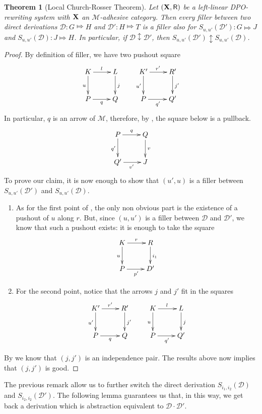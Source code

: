 \documentclass[a4paper]{article}
\def\R{\mathsf{R}}
\def\X{\textbf {\textup{X}}}
\renewcommand{\P}{\textbf {\textup{P}}}
\newcommand{\dder}[1]{\mathscr{#1}}
\newtheorem{theorem}{Theorem}[section]
\theoremstyle{definition}
\begin{document}
\begin{theorem}[Local Church-Rosser Theorem]\label{prop:fil}Let $(\X, \R)$ be a left-linear DPO-rewriting system with $\X$ an $\mathcal{M}$-adhesive category. Then every filler between two direct derivations $\dder{D}\colon G\Mapsto H$ and $\dder{D}'\colon H\Mapsto T$ is a filler also for $S_{u,u'}(\dder{D'})\colon G\Mapsto J$ and $S_{u,u'}(\dder{D})\colon J\Mapsto H$. In particular, if $\dder{D}\updownarrow \dder{D}'$, then $S_{u,u'}(\dder{D}')\updownarrow S_{u,u'}(\dder{D})$.
\end{theorem}
\begin{proof}By definition of filler, we have two pushout square
		\[\xymatrix{K \ar[r]^{l} \ar[d]_{u}& L \ar[d]^{j} & K' \ar[r]^{r'} \ar[d]_{u'} & R' \ar[d]^{j'}\\ P \ar[r]_q & Q & P \ar[r]_{q'} & Q'}\]
		In particular, $q$ is an arrow of $\mathcal{M}$, therefore, by , the square below is a pullback.
		\[\xymatrix{P \ar[r]^{q} \ar[d]_{q'}& Q\ar[d]^{v}\\ Q' \ar[r]_{v'} & J}\]
		To prove our claim, it is now enough to show that $(u',u)$ is a filler between $S_{u,u'}(\dder{D}')$ and $S_{u, u'}(\dder{D})$.
		\begin{enumerate}
			\item As for the first  point of , the only non obvious part is the existence of a pushout of $u$ along $r$. But, since $(u,u')$ is a filler between $\dder{D}$ and $\dder{D'}$, we know that such a pushout exists: it is enough to take the square
			\[\xymatrix{K \ar[r]^{r} \ar[d]_{u}& R \ar[d]^{i_1} \\P \ar[r]_{p'}& D'}\]
			\item For the second point, notice that the arrows $j$ and $j'$ fit in the squares
	\[\xymatrix{K' \ar[r]^{r'} \ar[d]_{u'}& R' \ar[d]^{j'} &K \ar[r]^{l} \ar[d]_{u}& L\ar[d]^{j} \\P \ar[r]_{q}& Q& P \ar[r]_{q'} & Q'}\] 
		\end{enumerate}
		
By  we know that $(j,j')$ is an independence pair. The results above now implies that $(j,j')$ is good.
\end{proof}

The previous remark allow us to further switch the direct derivation $S_{i_1,i_2}(\dder{D})$ and $S_{i_2,i_2}(\dder{D}')$. The following lemma guarantees us that, in this way, we get back a derivation which is abstraction equivalent to $\dder{D}\cdot \dder{D}'$.
\end{document}
